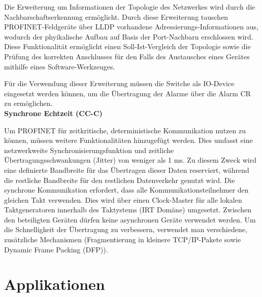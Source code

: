 Die Erweiterung um Informationen der Topologie des Netzwerkes wird durch die Nachbarschaftserkennung ermöglicht. Durch diese Erweiterung tauschen PROFINET-Feldgeräte über LLDP vorhandene Adressierungs-Informationen aus, wodurch der phyikalische Aufbau auf Basis der Port-Nachbarn erschlossen wird. Diese Funktionalität ermöglicht einen Soll-Ist-Vergleich der Topologie sowie die Prüfung des korrekten Anschlusses für den Falls des Austausches eines Gerätes mithilfe eines Software-Werkzeuges. 

Für die Verwendung dieser Erweiterung müssen die Switche als IO-Device eingesetzt werden können, um die Übertragung der Alarme über die Alarm CR zu ermöglichen. \\


\textbf{Synchrone Echtzeit (CC-C)}

Um PROFINET für zeitkritische, deterministische Kommunikation nutzen zu können, müssen weitere Funktionalitäten hinzugefügt werden. Dies umfasst eine netzwerkweite Synchronisierungsfunktion und zeitliche Übertragungsschwankungen (\glqq Jitter\grqq ) von weniger als 1 ms. Zu diesem Zweck wird eine definierte Bandbreite für das Übertragen dieser Daten reserviert, während die restliche Bandbreite für den restlichen Datenverkehr genutzt wird. Die synchrone Kommunikation erfordert, dass alle Kommunikationsteilnehmer den gleichen Takt verwenden. Dies wird über einen Clock-Master für alle lokalen Taktgeneratoren innerhalb des Taktystems (IRT Domäne) umgesetzt. Zwischen den beteiligten Geräten dürfen keine asynchronen Geräte verwendet werden. Um die Schnelligkeit der Übertragung zu verbessern, verwendet man verschiedene, zusätzliche Mechanismen (Fragmentierung in kleinere TCP/IP-Pakete sowie Dynamic Frame Packing (DFP)). 


\section{Applikationen}
